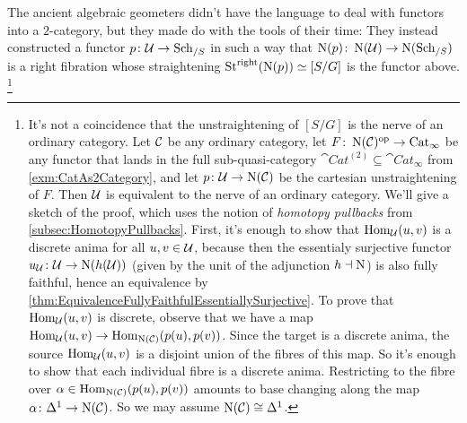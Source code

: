 \begin{numpar}
	The ancient algebraic geometers didn't have the language to deal with functors into a $2$-category, but they made do with the tools of their time: They instead constructed a functor $p\colon \mathcal{U}\rightarrow \mathrm{Sch}_{/S}$ in such a way that $\operatorname{N}(p)\colon \operatorname{N}(\mathcal{U})\rightarrow \operatorname{N}(\mathrm{Sch}_{/S})$ is a right fibration whose straightening $\operatorname{St}^{\mathrm{right}}(\operatorname{N}(p))\simeq [S/G]$ is the functor above.%
	\footnote{\label{footnote:UnstraighteningOrdinaryCategory}It's not a coincidence that the unstraightening of $[S/G]$ is the nerve of an ordinary category. Let $\mathcal{C}$ be any ordinary category, let $F\colon \operatorname{N}(\mathcal{C})^{\mathrm{op}}\rightarrow \mathrm{Cat}_\infty$ be any functor that lands in the full sub-quasi-category $\cat{Cat}^{(2)}\subseteq \cat{Cat}_\infty$ from \cref{exm:CatAs2Category}, and let $p\colon \mathcal{U}\rightarrow\operatorname{N}(\mathcal{C})$ be the cartesian unstraightening of $F$. Then $\mathcal{U}$ is equivalent to the nerve of an ordinary category. We'll give a sketch of the proof, which uses the notion of \emph{homotopy pullbacks} from \cref{subsec:HomotopyPullbacks}. First, it's enough to show that $\operatorname{Hom}_{\mathcal{U}}(u,v)$ is a discrete anima for all $u,v\in \mathcal{U}$, because then the essentialy surjective functor $u_{\mathcal{U}}\colon \mathcal{U}\rightarrow \operatorname{N}(h(\mathcal{U}))$ (given by the unit of the adjunction $h\dashv \operatorname{N}$) is also fully faithful, hence an equivalence by \cref{thm:EquivalenceFullyFaithfulEssentiallySurjective}. To prove that $\operatorname{Hom}_{\mathcal{U}}(u,v)$ is discrete, observe that we have a map $\operatorname{Hom}_{\mathcal{U}}(u,v)\rightarrow \operatorname{Hom}_{\operatorname{N}(\mathcal{C})}(p(u),p(v))$. Since the target is a discrete anima, the source $\operatorname{Hom}_{\mathcal{U}}(u,v)$ is a disjoint union of the fibres of this map. So it's enough to show that each individual fibre is a discrete anima. Restricting to the fibre over $\alpha\in\operatorname{Hom}_{\operatorname{N}(\mathcal{C})}(p(u),p(v))$ amounts to base changing along the map $\alpha\colon \Delta^1\rightarrow \operatorname{N}(\mathcal{C})$. So we may assume $\operatorname{N}(\mathcal{C})\cong \Delta^1$.
	
}
\end{numpar}
